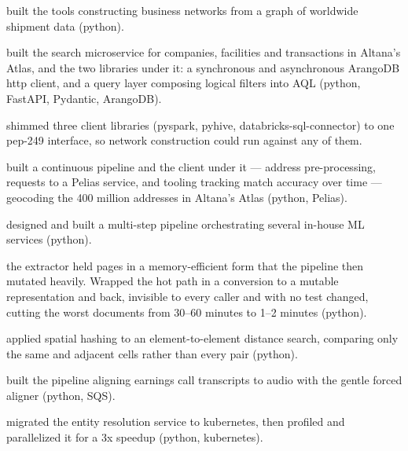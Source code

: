 \begin{bullets}
    \item {}built the tools constructing business networks from a graph of worldwide shipment data (python).
    \item {}built the search microservice for companies, facilities and transactions in Altana's Atlas, and the two libraries under it: a synchronous and asynchronous ArangoDB http client, and a query layer composing logical filters into AQL (python, FastAPI, Pydantic, ArangoDB).
    \item {}shimmed three client libraries (pyspark, pyhive, databricks-sql-connector) to one pep-249 interface, so network construction could run against any of them.
    \item {}built a continuous pipeline and the client under it --- address pre-processing, requests to a Pelias service, and tooling tracking match accuracy over time --- geocoding the {\mytilde}400 million addresses in Altana's Atlas (python, Pelias).
\end{bullets}

\begin{bullets}
    \item {}designed and built a multi-step pipeline orchestrating several in-house ML services (python).
    \item {}the extractor held pages in a memory-efficient form that the pipeline then mutated heavily. Wrapped the hot path in a conversion to a mutable representation and back, invisible to every caller and with no test changed, cutting the worst documents from 30--60 minutes to 1--2 minutes (python).
    \item {}applied spatial hashing to an element-to-element distance search, comparing only the same and adjacent cells rather than every pair (python).
    \item {}built the pipeline aligning earnings call transcripts to audio with the gentle forced aligner (python, SQS).
    \item {}migrated the entity resolution service to kubernetes, then profiled and parallelized it for a {\mytilde}3x speedup (python, kubernetes).
\end{bullets}

